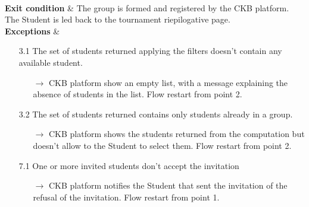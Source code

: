 \documentclass{article}
\begin{document}
{\begin{enumerate}
\begin{xltabular}{\textwidth}
\begin{enumerate}
                                                    \end{enumerate} \\
                        \hline
                        \textbf{Exit condition} & The group is formed and registered by the 
                        CKB platform. The Student is led back to the tournament riepilogative page.\\
                        \hline
                        \textbf{Exceptions} &    \begin{itemize}
                                                    \item[3.1] The set of students returned applying the filters
                                                    doesn't contain any available student.
                                                    \begin{itemize}
                                                        \item[$\rightarrow$] CKB platform show an empty list, with
                                                        a message explaining the absence of students in the list. Flow restart from point 2.
                                                    \end{itemize} 
                                                    \item[3.2] The set of students returned contains only students
                                                    already in a group.
                                                    \begin{itemize}
                                                        \item[$\rightarrow$] CKB platform shows the students returned
                                                        from the computation but doesn't allow to the Student to select them.
                                                        Flow restart from point 2.
                                                    \end{itemize} 
                                                    \item[7.1] One or more invited students don't accept the invitation
                                                    \begin{itemize}
                                                        \item[$\rightarrow$] CKB platform notifies the Student that sent the invitation
                                                        of the refusal of the invitation. Flow restart from point 1.
                                                    \end{itemize} 
                                                \end{itemize}
                    \end{xltabular}
                    

\end{enumerate}}
\end{document}
